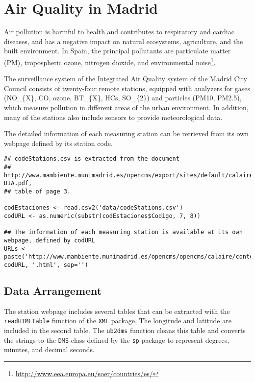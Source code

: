 
\section{Air Quality in Madrid}
\label{sec-1}
\label{sec:airQualityData}

Air pollution is harmful to health and contributes to respiratory and
cardiac diseases, and has a negative impact on natural ecosystems,
agriculture, and the built environment. In Spain, the principal
pollutants are particulate matter (PM), tropospheric ozone, nitrogen
dioxide, and environmental noise\footnote{\url{http://www.eea.europa.eu/soer/countries/es/}}.

The surveillance system of the Integrated Air Quality system of the
Madrid City Council consists of twenty-four remote stations, equipped
with analyzers for gases (NO\_\{X\}, CO, ozone, BT\_\{X\}, HCs, SO\_\{2\}) and
particles (PM10, PM2.5), which measure pollution in different areas of
the urban environment. In addition, many of the stations also include
sensors to provide meteorological data.

The detailed information of each measuring station can be retrieved
from its own webpage defined by its station code.
\lstset{language=R,numbers=none}
\begin{lstlisting}
## codeStations.csv is extracted from the document
## http://www.mambiente.munimadrid.es/opencms/export/sites/default/calaire/Anexos/INTPHORA-DIA.pdf,
## table of page 3.

codEstaciones <- read.csv2('data/codeStations.csv')
codURL <- as.numeric(substr(codEstaciones$Codigo, 7, 8))

## The information of each measuring station is available at its own webpage, defined by codURL
URLs <- paste('http://www.mambiente.munimadrid.es/opencms/opencms/calaire/contenidos/estaciones/estacion', codURL, '.html', sep='')
\end{lstlisting}

\subsection{\floweroneleft Data Arrangement}
\label{sec-1-1}
The station webpage includes several tables that can be extracted with
the \texttt{readHTMLTable} function of the \texttt{XML} package.  The longitude and
latitude are included in the second table. The \texttt{ub2dms} function
cleans this table and converts the strings to the \texttt{DMS} class defined
by the \texttt{sp} package to represent degrees, minutes, and decimal
seconds.

